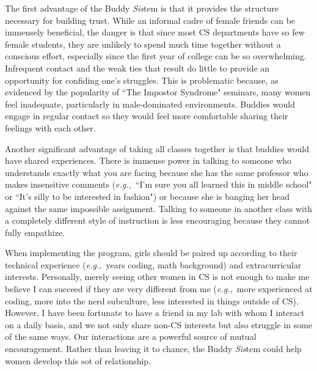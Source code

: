 \documentclass{article}
\newcommand{\eg}{{\em e.g.,}~}
\begin{document}
The first advantage of the Buddy \textit{Sis}tem is that it provides the structure necessary for building trust.
While an informal cadre of female friends can be immensely beneficial, the danger is that since most CS departments have so few female students, they are unlikely to spend much time together without a conscious effort, especially since the first year of college can be so overwhelming.
Infrequent contact and the weak ties that result do little to provide an opportunity for confiding one's struggles.
This is problematic because, as evidenced by the popularity of ``The Impostor Syndrome" seminars, many women feel inadequate, particularly in male-dominated environments.
Buddies would engage in regular contact so they would feel more comfortable sharing their feelings with each other.

Another significant advantage of taking all classes together is that buddies would have shared experiences.
There is immense power in talking to someone who understands exactly what you are facing because she has the same professor who makes insensitive comments (\eg ``I'm sure you all learned this in middle school" or ``It's silly to be interested in fashion") or because she is banging her head against the same impossible assignment.
Talking to someone in another class with a completely different style of instruction is less encouraging because they cannot fully empathize.


When implementing the program, girls should be paired up according to their technical experience (\eg years coding, math background) and extracurricular interests.
Personally, merely seeing other women in CS is not enough to make me believe I can succeed if they are very different from me (\eg more experienced at coding, more into the nerd subculture, less interested in things outside of CS).
However, I have been fortunate to have a friend in my lab with whom I interact on a daily basis, and we not only share non-CS interests but also struggle in some of the same ways.
Our interactions are a powerful source of mutual encouragement.
Rather than leaving it to chance, the Buddy \textit{Sis}tem could help women develop this sot of relationship.
\end{document}
